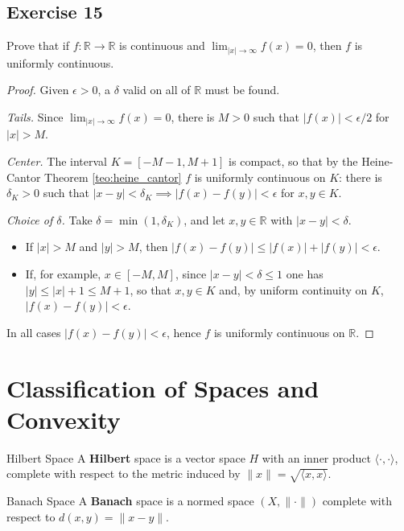 \documentclass[11pt, a4paper]{article}
\begin{document}
\subsection*{Exercise 15}

Prove that if $f: \mathbb{R} \to \mathbb{R}$ is continuous and $\lim_{|x| \to \infty} f(x) = 0$,
then $f$ is uniformly continuous.

\begin{proof}
Given $\epsilon > 0$, a $\delta$ valid on all of $\mathbb{R}$ must be found.

\textit{Tails.} Since $\lim_{|x| \to \infty} f(x) = 0$, there is $M > 0$ such that $|f(x)| < \epsilon/2$
for $|x| > M$.

\textit{Center.} The interval $K = [-M-1, M+1]$ is compact, so that by the Heine-Cantor Theorem
\ref{teo:heine_cantor} $f$ is uniformly continuous on $K$: there is $\delta_K > 0$ such that
$|x - y| < \delta_K \implies |f(x) - f(y)| < \epsilon$ for $x, y \in K$.

\textit{Choice of $\delta$.} Take $\delta = \min(1, \delta_K)$, and let $x, y \in \mathbb{R}$ with
$|x - y| < \delta$.
\begin{itemize}
    \item If $|x| > M$ and $|y| > M$, then $|f(x) - f(y)| \le |f(x)| + |f(y)| < \epsilon$.
    \item If, for example, $x \in [-M, M]$, since $|x - y| < \delta \le 1$ one has
    $|y| \le |x| + 1 \le M + 1$, so that $x, y \in K$ and, by uniform continuity on $K$,
    $|f(x) - f(y)| < \epsilon$.
\end{itemize}
In all cases $|f(x) - f(y)| < \epsilon$, hence $f$ is uniformly continuous on $\mathbb{R}$.
\end{proof}

\newpage

\section{Classification of Spaces and Convexity}

\begin{definicion}{Hilbert Space}{}
A \textbf{Hilbert} space is a vector space $H$ with an inner product $\langle\cdot, \cdot\rangle$, complete
with respect to the metric induced by $\|x\| = \sqrt{\langle x, x \rangle}$.
\end{definicion}

\begin{definicion}{Banach Space}{}
A \textbf{Banach} space is a normed space $(X, \|\cdot\|)$ complete with respect to $d(x,y) = \|x-y\|$.
\end{definicion}
\end{document}
